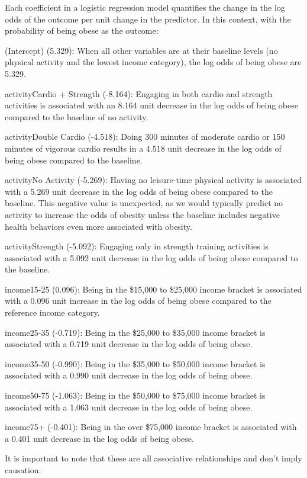 \documentclass[
  letterpaper,
  DIV=11,
  numbers=noendperiod]{scrartcl}
\begin{document}
Each coefficient in a logistic regression model quantifies the change in
the log odds of the outcome per unit change in the predictor. In this
context, with the probability of being obese as the outcome:

(Intercept) (5.329): When all other variables are at their baseline
levels (no physical activity and the lowest income category), the log
odds of being obese are 5.329.

activityCardio + Strength (-8.164): Engaging in both cardio and strength
activities is associated with an 8.164 unit decrease in the log odds of
being obese compared to the baseline of no activity.

activityDouble Cardio (-4.518): Doing 300 minutes of moderate cardio or
150 minutes of vigorous cardio results in a 4.518 unit decrease in the
log odds of being obese compared to the baseline.

activityNo Activity (-5.269): Having no leisure-time physical activity
is associated with a 5.269 unit decrease in the log odds of being obese
compared to the baseline. This negative value is unexpected, as we would
typically predict no activity to increase the odds of obesity unless the
baseline includes negative health behaviors even more associated with
obesity.

activityStrength (-5.092): Engaging only in strength training activities
is associated with a 5.092 unit decrease in the log odds of being obese
compared to the baseline.

income15-25 (0.096): Being in the \$15,000 to \$25,000 income bracket is
associated with a 0.096 unit increase in the log odds of being obese
compared to the reference income category.

income25-35 (-0.719): Being in the \$25,000 to \$35,000 income bracket
is associated with a 0.719 unit decrease in the log odds of being obese.

income35-50 (-0.990): Being in the \$35,000 to \$50,000 income bracket
is associated with a 0.990 unit decrease in the log odds of being obese.

income50-75 (-1.063): Being in the \$50,000 to \$75,000 income bracket
is associated with a 1.063 unit decrease in the log odds of being obese.

income75+ (-0.401): Being in the over \$75,000 income bracket is
associated with a 0.401 unit decrease in the log odds of being obese.

It is important to note that these are all associative relationships and
don't imply causation.
\end{document}
